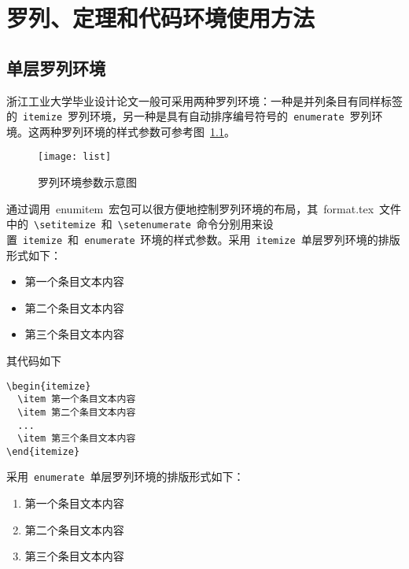 
\chapter{罗列、定理和代码环境使用方法}

\section{单层罗列环境}

浙江工业大学毕业设计论文一般可采用两种罗列环境：一种是并列条目有同样标签的~\verb|itemize|~罗列环境，另一种是具有自动排序编号符号的~\verb|enumerate|~罗列环境。这两种罗列环境的样式参数可参考图~\ref{fig:list}。
\begin{figure}[htbp]
\centering
\texttt{[image: list]}
\caption{罗列环境参数示意图}\label{fig:list}\vspace{-1em}
\end{figure}

通过调用~enumitem~宏包可以很方便地控制罗列环境的布局，其~format.tex~文件中的~\verb|\setitemize|~和~\verb|\setenumerate|~命令分别用来设置~\verb|itemize|~和~\verb|enumerate|~环境的样式参数。采用~\verb|itemize|~单层罗列环境的排版形式如下：

\begin{itemize}
\item 第一个条目文本内容
\item 第二个条目文本内容
\item 第三个条目文本内容
\end{itemize}

其代码如下

\lstset{language=tex,tabsize=4}
\begin{lstlisting}
\begin{itemize}
  \item 第一个条目文本内容
  \item 第二个条目文本内容
  ...
  \item 第三个条目文本内容
\end{itemize}
\end{lstlisting}

采用~\verb|enumerate|~单层罗列环境的排版形式如下：

\begin{enumerate}
\item 第一个条目文本内容
\item 第二个条目文本内容
\item 第三个条目文本内容
\end{enumerate}

